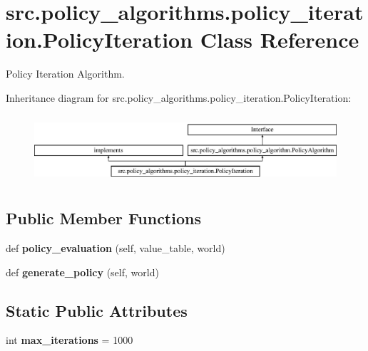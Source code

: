 \hypertarget{classsrc_1_1policy__algorithms_1_1policy__iteration_1_1_policy_iteration}{}\section{src.\+policy\+\_\+algorithms.\+policy\+\_\+iteration.\+Policy\+Iteration Class Reference}
\label{classsrc_1_1policy__algorithms_1_1policy__iteration_1_1_policy_iteration}


Policy Iteration Algorithm.  


Inheritance diagram for src.\+policy\+\_\+algorithms.\+policy\+\_\+iteration.\+Policy\+Iteration\+:\begin{figure}[H]
\begin{center}
\leavevmode
\includegraphics[height=2.560976cm]{classsrc_1_1policy__algorithms_1_1policy__iteration_1_1_policy_iteration}
\end{center}
\end{figure}
\subsection*{Public Member Functions}
\begin{DoxyCompactItemize}
\item 
\mbox{\label{classsrc_1_1policy__algorithms_1_1policy__iteration_1_1_policy_iteration_a16d3917b7f1e8c813763468537593c68}} 
def {\bfseries policy\+\_\+evaluation} (self, value\+\_\+table, world)
\item 
\mbox{\label{classsrc_1_1policy__algorithms_1_1policy__iteration_1_1_policy_iteration_a7ee703e2982604f37990128d183e5422}} 
def {\bfseries generate\+\_\+policy} (self, world)
\end{DoxyCompactItemize}
\subsection*{Static Public Attributes}
\begin{DoxyCompactItemize}
\item 
\mbox{\label{classsrc_1_1policy__algorithms_1_1policy__iteration_1_1_policy_iteration_a1709b4d028502f68d9f6c3b735aea86a}} 
int {\bfseries max\+\_\+iterations} = 1000
\end{DoxyCompactItemize}


